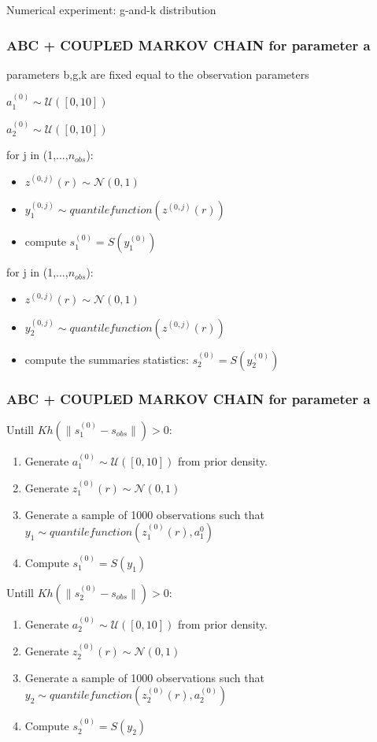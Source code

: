 \documentclass{beamer}
\begin{document}
\begin{section}{Numerical experiment: g-and-k distribution}
\begin{frame}
\begin{enumerate}
	\end{enumerate} 
\end{frame}




\begin{frame}
	\frametitle{ABC + COUPLED MARKOV CHAIN for parameter a}
	
	parameters b,g,k are fixed equal to the observation parameters
	
	
	$ a_{1}^{(0)} \sim \mathcal{U}([0,10])$
	
	$ a_{2}^{(0)} \sim \mathcal{U}([0,10])$
	
	for j in (1,...,$n_{obs}$):
	\begin{itemize}
	\item $z^{(0,j)}(r) \sim \mathcal{N}(0,1)  $
	
	\item $ y_{1}^{(0,j)} \sim quantile function(z^{(0,j)}(r))$
	
	\item compute $ s_{1}^{(0)} =S(y_{1}^{(0)})$
	\end{itemize}
	for j in (1,...,$n_{obs}$):
	
	\begin{itemize}
	\item $z^{(0,j)}(r) \sim \mathcal{N}(0,1)  $
	
	\item $ y_{2}^{(0,j)} \sim quantile function(z^{(0,j)}(r))$
	
	\item compute the summaries statistics:
	$ s_{2}^{(0)} =S(y_{2}^{(0)})$
	\end{itemize}
	
\end{frame}
\begin{frame}
	\frametitle{ABC + COUPLED MARKOV CHAIN for parameter a}
	Untill $Kh(\|s_{1}^{(0)} - s_{obs}\|)>0$:
	\begin{enumerate}
	\item Generate $a_{1}^{(0)} \sim \mathcal{U}([0,10])$ from prior density.
	\item Generate $z_{1}^{(0)}(r) \sim \mathcal{N}(0,1)$
	\item Generate a sample of 1000 observations such that $y_{1} \sim quantile function(z_{1}^{(0)}(r),a_{1}^{0})$
	\item Compute $s_{1}^{(0)}=S(y_{1})$
	
	\end{enumerate}
	Untill $Kh(\|s_{2}^{(0)} - s_{obs}\|)>0$:
	\begin{enumerate}
	\item Generate $a_{2}^{(0)} \sim \mathcal{U}([0,10])$ from prior density.
	\item Generate $z_{2}^{(0)}(r) \sim \mathcal{N}(0,1)$
	\item Generate a sample of 1000 observations such that $y_{2} \sim quantile function(z_{2}^{(0)}(r),a_{2}^{(0)})$
	\item Compute $s_{2}^{(0)}=S(y_{2})$
	\end{enumerate}
	

\end{frame}
\end{section}
\end{document}
